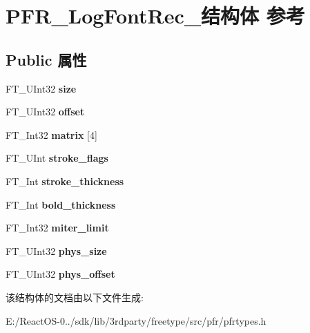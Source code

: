 \hypertarget{struct_p_f_r___log_font_rec__}{}\section{P\+F\+R\+\_\+\+Log\+Font\+Rec\+\_\+结构体 参考}
\label{struct_p_f_r___log_font_rec__}
\subsection*{Public 属性}
\begin{DoxyCompactItemize}
\item 
\mbox{\label{struct_p_f_r___log_font_rec___af1b75f2094ebb7b2331e97a2a304e83d}} 
F\+T\+\_\+\+U\+Int32 {\bfseries size}
\item 
\mbox{\label{struct_p_f_r___log_font_rec___a7bb67b08ec6c6acea4228f30c4c72fe7}} 
F\+T\+\_\+\+U\+Int32 {\bfseries offset}
\item 
\mbox{\label{struct_p_f_r___log_font_rec___a5f1639df2dd2532b641ead642e5aeeb0}} 
F\+T\+\_\+\+Int32 {\bfseries matrix} \mbox{[}4\mbox{]}
\item 
\mbox{\label{struct_p_f_r___log_font_rec___a9e4e391cf39aa28305a6a5ce84828a2c}} 
F\+T\+\_\+\+U\+Int {\bfseries stroke\+\_\+flags}
\item 
\mbox{\label{struct_p_f_r___log_font_rec___a89b41a55247d100da2c3bd101830515c}} 
F\+T\+\_\+\+Int {\bfseries stroke\+\_\+thickness}
\item 
\mbox{\label{struct_p_f_r___log_font_rec___afc155ccae1a3391e8ec45f85ed6b1e2c}} 
F\+T\+\_\+\+Int {\bfseries bold\+\_\+thickness}
\item 
\mbox{\label{struct_p_f_r___log_font_rec___aff18bf69b018cfabb869fd73c7560f01}} 
F\+T\+\_\+\+Int32 {\bfseries miter\+\_\+limit}
\item 
\mbox{\label{struct_p_f_r___log_font_rec___a82ba81da8b8fa9aaf82b8ca849ff9d4e}} 
F\+T\+\_\+\+U\+Int32 {\bfseries phys\+\_\+size}
\item 
\mbox{\label{struct_p_f_r___log_font_rec___a5ebf12096a8a125b9b41b74bb5e815b2}} 
F\+T\+\_\+\+U\+Int32 {\bfseries phys\+\_\+offset}
\end{DoxyCompactItemize}


该结构体的文档由以下文件生成\+:\begin{DoxyCompactItemize}
\item 
E\+:/\+React\+O\+S-\/0../sdk/lib/3rdparty/freetype/src/pfr/pfrtypes.\+h\end{DoxyCompactItemize}
